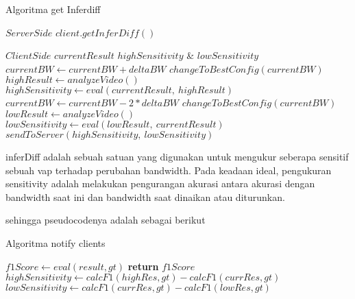         \begin{algorithm}
            \caption{Algoritma get Inferdiff}\label{alg:getInferdiff}
            \begin{multicols}{2}
                \begin{algorithmic}
                    \scriptsize
                    \State $Server Side$
                    \State $client.getInferDiff()$
                    \EndFor
                \end{algorithmic}
                \columnbreak
                \begin{algorithmic}
                    \scriptsize
                    \State $Client Side$
                    \Require $currentResult$
                    \Ensure $highSensitivity$ \& $lowSensitivity$
                    \State $currentBW \gets currentBW + deltaBW$
                    \State $changeToBestConfig(currentBW)$
                    \State $highResult \gets analyzeVideo()$
                    \State $highSensitivity \gets eval(currentResult,\ highResult)$
                    \State $currentBW \gets currentBW - 2 * deltaBW$
                    \State $changeToBestConfig(currentBW)$
                    \State $lowResult \gets analyzeVideo()$
                    \State $lowSensitivity \gets eval(lowResult,\ currentResult)$
                    \State $sendToServer(highSensitivity,\ lowSensitivity)$
                \end{algorithmic}
            \end{multicols}
        \end{algorithm}

        inferDiff adalah sebuah satuan yang digunakan untuk mengukur seberapa sensitif sebuah \gls{vap} terhadap perubahan bandwidth. Pada keadaan ideal, pengukuran sensitivity
        adalah melakukan pengurangan akurasi antara akurasi dengan bandwidth saat ini dan bandwidth saat dinaikan atau diturunkan.

        sehingga pseudocodenya adalah sebagai berikut

        \begin{algorithm}[tbh]
        \caption{Algoritma notify clients}\label{alg:calcF1}
        \begin{algorithmic}[1]
            \State $f1Score \gets eval(result, gt)$
            \State \textbf{return} $f1Score$
        \EndFunction
        \State $highSensitivity \gets calcF1(highRes, gt) - calcF1(currRes, gt)$
        \State $lowSensitivity \gets calcF1(currRes, gt) - calcF1(lowRes, gt)$
        \end{algorithmic}
        \end{algorithm}

